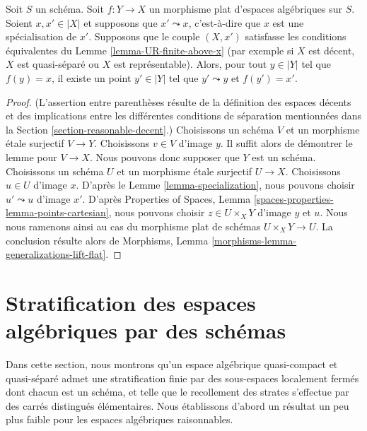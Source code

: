\begin{lemma}
\label{lemma-generalizations-lift-flat}
Soit $S$ un schéma. Soit $f : Y \to X$ un morphisme plat d'espaces algébriques
sur $S$. Soient $x, x' \in |X|$ et supposons que $x' \leadsto x$, c'est-à-dire
que $x$ est une spécialisation de $x'$. Supposons que le couple $(X, x')$
satisfasse les conditions équivalentes du
Lemme \ref{lemma-UR-finite-above-x} (par exemple si
$X$ est décent, $X$ est quasi-séparé ou $X$ est représentable).
Alors, pour tout $y \in |Y|$ tel que $f(y) = x$, il existe un point
$y' \in |Y|$ tel que $y' \leadsto y$ et $f(y') = x'$.
\end{lemma}

\begin{proof}
(L'assertion entre parenthèses résulte de la définition des espaces décents
et des implications entre les différentes conditions de séparation
mentionnées dans la Section \ref{section-reasonable-decent}.)
Choisissons un schéma $V$ et un morphisme étale surjectif $V \to Y$.
Choisissons $v \in V$ d'image $y$. Il suffit alors de démontrer le lemme pour
$V \to X$. Nous pouvons donc supposer que $Y$ est un schéma.
Choisissons un schéma $U$ et un morphisme étale surjectif $U \to X$.
Choisissons $u \in U$ d'image $x$. D'après le
Lemme \ref{lemma-specialization}, nous pouvons choisir $u' \leadsto u$
d'image $x'$. D'après Properties of Spaces,
Lemma \ref{spaces-properties-lemma-points-cartesian},
nous pouvons choisir $z \in U \times_X Y$ d'image $y$ et $u$.
Nous nous ramenons ainsi au cas du morphisme plat de schémas
$U \times_X Y \to U$. La conclusion résulte alors de
Morphisms, Lemma \ref{morphisms-lemma-generalizations-lift-flat}.
\end{proof}






\section{Stratification des espaces algébriques par des schémas}
\label{section-stratifications}

\noindent
Dans cette section, nous montrons qu'un espace algébrique quasi-compact et
quasi-séparé admet une stratification finie par des sous-espaces localement
fermés dont chacun est un schéma, et telle que le recollement des strates
s'effectue par des carrés distingués élémentaires. Nous établissons d'abord
un résultat un peu plus faible pour les espaces algébriques raisonnables.

